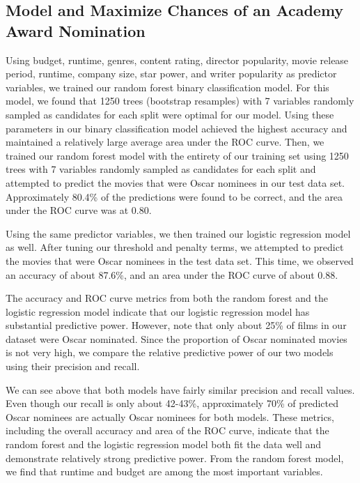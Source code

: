 \documentclass[10pt]{article}
\begin{document}
\subsection{Model and Maximize Chances of an Academy Award Nomination}

Using budget, runtime, genres, content rating, director popularity, movie release period, runtime, company size, star power, and writer popularity as predictor variables, we trained our random forest binary classification model. For this model, we found that 1250 trees (bootstrap resamples) with 7 variables randomly sampled as candidates for each split were optimal for our model. Using these parameters in our binary classification model achieved the highest accuracy and maintained a relatively large average area under the ROC curve. Then, we trained our random forest model with the entirety of our training set using 1250 trees with 7 variables randomly sampled as candidates for each split and attempted to predict the movies that were Oscar nominees in our test data set. Approximately 80.4\% of the predictions were found to be correct, and the area under the ROC curve was at 0.80. 

Using the same predictor variables, we then trained our logistic regression model as well. After tuning our threshold and penalty terms, we attempted to predict the movies that were Oscar nominees in the test data set. This time, we observed an accuracy of about 87.6\%, and an area under the ROC curve of about 0.88.

The accuracy and ROC curve metrics from both the random forest and the logistic regression model indicate that our logistic regression model has substantial predictive power. However, note that only about 25\% of films in our dataset were Oscar nominated. Since the proportion of Oscar nominated movies is not very high, we compare the relative predictive power of our two models using their precision and recall. 



We can see above that both models have fairly similar precision and recall values. Even though our recall is only about 42-43\%, approximately 70\% of predicted Oscar nominees are actually Oscar nominees for both models. These metrics, including the overall accuracy and area of the ROC curve, indicate that the random forest and the logistic regression model both fit the data well and demonstrate relatively strong predictive power. From the random forest model, we find that runtime and budget are among the most important variables.
\end{document}
